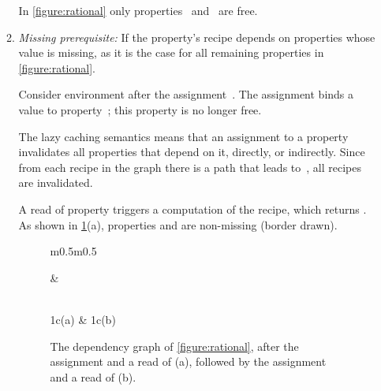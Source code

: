 \begin{enumerate}
\begin{enumerate}
          In \cref{figure:rational} only properties~ and~ are free.

    \item \emph{Missing prerequisite:} If the property's recipe depends on
          properties whose value is missing, as it is the case for all
          remaining properties in \cref{figure:rational}.

          Consider environment  after the assignment~.
          The assignment binds a value to property~; this property
          is no longer free.

          The lazy caching semantics means that an assignment to a property
          invalidates all properties that depend on it, directly, or indirectly.
          Since from each recipe in the graph there is a path that leads %
          to~, all recipes are invalidated.

          A read of property  triggers a computation of the
          recipe, which returns . As shown in \cref{figure:assignments}(a),
          properties  and  are non-missing (border drawn).

          \begin{figure}[H]
            \caption{\label{figure:assignments}%
              The dependency graph of \cref{figure:rational},
              after the assignment  and a read of  (a), 
              followed by the assignment  and a read of 
               (b).
            }
            \begin{tabular}{m{}m{}}
              \begin{minipage}[t]{0.5\columnwidth}
              \begin{adjustbox}{width=\columnwidth}
              
              \end{adjustbox}
              \end{minipage}
              & 
              \begin{minipage}[t]{0.5\columnwidth}
              \begin{adjustbox}{width=\columnwidth}
              
              \end{adjustbox}
              \end{minipage}
                \\ \multicolumn1c{(a)} & \multicolumn1c{(b)}
            \end{tabular}
          \end{figure}


\end{enumerate}
\end{enumerate}

